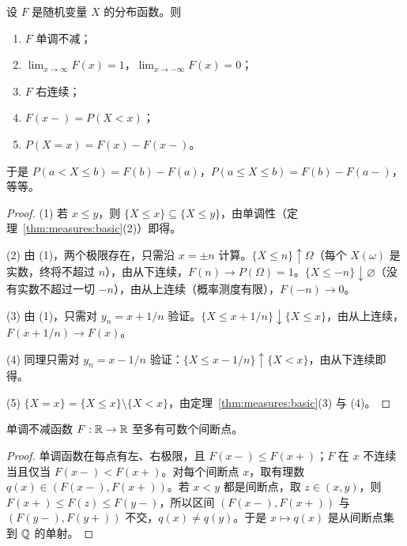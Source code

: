 \begin{theorem}[分布函数的性质]\label{thm:distributions:df-properties}
设 $F$ 是随机变量 $X$ 的分布函数。则
\begin{enumerate}
\item $F$ 单调不减；
\item $\lim_{x\to\infty}F(x)=1$，$\lim_{x\to-\infty}F(x)=0$；
\item $F$ 右连续；
\item $F(x-)=P(X<x)$；
\item $P(X=x)=F(x)-F(x-)$。
\end{enumerate}
于是 $P(a<X\leqslant b)=F(b)-F(a)$，$P(a\leqslant X\leqslant b)=F(b)-F(a-)$，等等。
\end{theorem}
\begin{proof}
(1) 若 $x\leqslant y$，则 $\{X\leqslant x\}\subseteq\{X\leqslant y\}$，由单调性（定理~\ref{thm:measures:basic}(2)）即得。

(2) 由 (1)，两个极限存在，只需沿 $x=\pm n$ 计算。$\{X\leqslant n\}\uparrow\Omega$（每个 $X(\omega)$ 是实数，终将不超过 $n$），由从下连续，$F(n)\to P(\Omega)=1$。$\{X\leqslant-n\}\downarrow\varnothing$（没有实数不超过一切 $-n$），由从上连续（概率测度有限），$F(-n)\to0$。

(3) 由 (1)，只需对 $y_n=x+1/n$ 验证。$\{X\leqslant x+1/n\}\downarrow\{X\leqslant x\}$，由从上连续，$F(x+1/n)\to F(x)$。

(4) 同理只需对 $y_n=x-1/n$ 验证：$\{X\leqslant x-1/n\}\uparrow\{X<x\}$，由从下连续即得。

(5) $\{X=x\}=\{X\leqslant x\}\setminus\{X<x\}$，由定理~\ref{thm:measures:basic}(3) 与 (4)。
\end{proof}

\begin{proposition}\label{prop:distributions:jumps}
单调不减函数 $F:\mathbb{R}\to\mathbb{R}$ 至多有可数个间断点。
\end{proposition}
\begin{proof}
单调函数在每点有左、右极限，且 $F(x-)\leqslant F(x+)$；$F$ 在 $x$ 不连续当且仅当 $F(x-)<F(x+)$。对每个间断点 $x$，取有理数 $q(x)\in(F(x-),F(x+))$。若 $x<y$ 都是间断点，取 $z\in(x,y)$，则 $F(x+)\leqslant F(z)\leqslant F(y-)$，所以区间 $(F(x-),F(x+))$ 与 $(F(y-),F(y+))$ 不交，$q(x)\neq q(y)$。于是 $x\mapsto q(x)$ 是从间断点集到 $\mathbb{Q}$ 的单射。
\end{proof}

